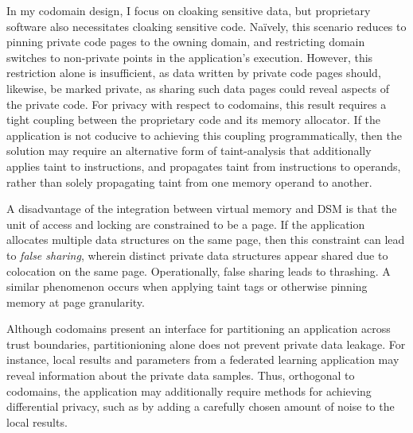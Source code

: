%
In my codomain design, I focus on cloaking sensitive data, but proprietary
software also necessitates cloaking sensitive code.
%
Na\"{i}vely, this scenario reduces to pinning private code pages to the owning
domain, and restricting domain switches to non-private points in the
application's execution.
%
However, this restriction alone is insufficient, as data written by private
code pages should, likewise, be marked private, as sharing such data pages
could reveal aspects of the private code.
%
For privacy with respect to codomains, this result requires a tight coupling
between the proprietary code and its memory allocator.
%
If the application is not coducive to achieving this coupling programmatically,
then the solution may require an alternative form of taint-analysis that
additionally applies taint to instructions, and propagates taint from
instructions to operands, rather than solely propagating taint from one memory
operand to another.


%
A disadvantage of the integration between virtual memory and DSM is that the
unit of access and locking are constrained to be a page.
%
If the application allocates multiple data structures on the same page, then
this constraint can lead to \emph{false sharing}, wherein distinct private data
structures appear shared due to colocation on the same page.
%
Operationally, false sharing leads to thrashing.
%
A similar phenomenon occurs when applying taint tags or otherwise pinning
memory at page granularity.


%
Although codomains present an interface for partitioning an application across
trust boundaries, partitionioning alone does not prevent private data leakage.
%
For instance, local results and parameters from a federated learning
application may reveal information about the private data samples.
%
Thus, orthogonal to codomains, the application may additionally require
methods for achieving differential privacy, such as by adding a carefully
chosen amount of noise to the local results.


%



%


%  
%       

